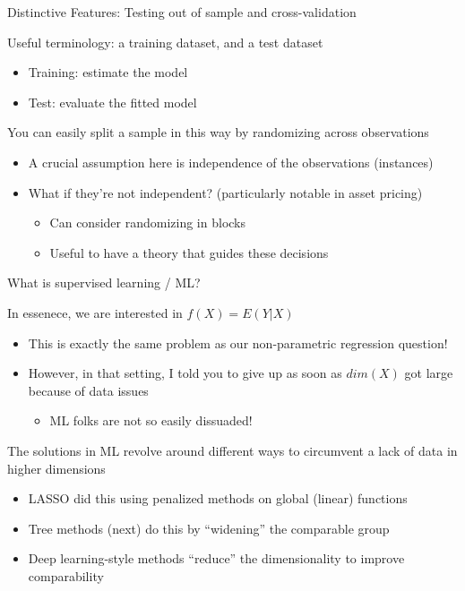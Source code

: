 \documentclass[notes,11pt, aspectratio=169]{beamer}
\newenvironment{wideitemize}{\itemize\addtolength{\itemsep}{10pt}}{\enditemize}
\begin{document}
\begin{frame}{Distinctive Features: Testing out of sample and cross-validation}
  \begin{wideitemize}
  \item Useful terminology: a training dataset, and a test dataset
    \begin{itemize}
    \item Training: estimate the model
    \item Test: evaluate the fitted model
    \end{itemize}
  \item You can easily split a sample in this way by randomizing across observations
    \begin{itemize}
    \item A crucial assumption here is independence of the observations (instances)
    \item What if they're not independent? (particularly notable in asset pricing)
      \begin{itemize}
      \item Can consider randomizing in blocks
      \item Useful to have a theory that guides these decisions
      \end{itemize}
    \end{itemize}
  \end{wideitemize}
\end{frame}



\begin{frame}{What is supervised learning / ML?}
  \begin{wideitemize}
  \item In essenece, we are interested in $f(X) = E(Y | X)$
    \begin{itemize}
    \item This is exactly the same problem as our non-parametric regression question!
    \item However, in that setting, I told you to give up as soon as $dim(X)$ got large because of data issues
      \begin{itemize}
      \item ML folks are not so easily dissuaded!
      \end{itemize}
    \end{itemize}
  \item The solutions in ML revolve around different ways to circumvent a lack of data in higher dimensions
    \begin{itemize}
    \item LASSO did this using penalized methods on global (linear) functions
    \item Tree methods (next) do this by ``widening'' the comparable group
    \item Deep learning-style methods ``reduce'' the dimensionality to improve comparability
    \end{itemize}
  \end{wideitemize}
\end{frame}
\end{document}
